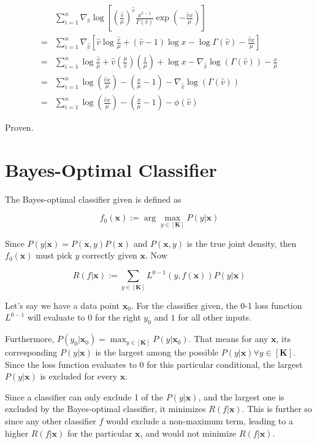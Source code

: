 \documentclass[11pt]{scrartcl}
\begin{document}
\begin{align*}
&\sum_{i=1}^n \nabla_{\hat{v}} \log{\left[ \left(\frac{{\hat{v}}}{\mu}\right)^{\hat{v}} \frac{x^{{\hat{v}}-1}}{\Gamma({\hat{v}})} \exp{\left(-\frac{{\hat{v}}x}{\mu}\right)} \right]} \\
= &\sum_{i=1}^n \nabla_{\hat{{\hat{v}}}} \left[ {\hat{v}} \log{\frac{{\hat{v}}}{\mu}} + ({\hat{v}}-1)\log{x} - \log{\Gamma({\hat{v}})} - \frac{{\hat{v}}x}{\mu} \right] \\
= &\sum_{i=1}^n \log{\frac{{\hat{v}}}{\mu}} + {\hat{v}}\left(\frac{\mu}{{\hat{v}}}\right)\left(\frac{1}{\mu}\right) + \log{x} - \nabla_{\hat{{\hat{v}}}} \log{(\Gamma({\hat{v}}))} - \frac{x}{\mu} \\
= &\sum_{i=1}^n \log{\left(\frac{{\hat{v}}x}{\mu}\right)} - \left(\frac{x}{\mu} - 1\right) - \nabla_{\hat{{\hat{v}}}}\log{(\Gamma({\hat{v}}))} \\
= &\sum_{i=1}^n \log{\left(\frac{{\hat{v}}x}{\mu}\right)} - \left(\frac{x}{\mu} - 1\right) - \phi(\hat{v})
\end{align*}

Proven.

\section{Bayes-Optimal Classifier}

The Bayes-optimal classifier given is defined as

\[f_0(\mathbf{x}) := \arg\max_{y \in [\mathbf{K}]} P(y | \mathbf{x})\]

Since $P(y|\mathbf{x}) = P(\mathbf{x}, y)P(\mathbf{x})$ and $P(\mathbf{x}, y)$ is the true joint density, then $f_0(\mathbf{x})$ must pick $y$ correctly given $\mathbf{x}$. Now

\[R(f|\mathbf{x}) := \sum_{y \in [\mathbf{K}]} L^{0-1}(y,f(\mathbf{x}))P(y|\mathbf{x})\]

Let's say we have a data point $\mathbf{x}_0$. For the classifier given, the 0-1 loss function $L^{0-1}$ will evaluate to 0 for the right $y_0$ and $1$ for all other inputs.

Furthermore, $P(y_0|\mathbf{x}_0) = \max_{y\in[\mathbf{K}]}P(y|\mathbf{x}_0)$. That means for any $\mathbf{x}$, its corresponding $P(y|\mathbf{x})$ is the largest among the possible $P(y|\mathbf{x}) \forall y \in [\mathbf{K}]$. Since the loss function evaluates to 0 for this particular conditional, the largest $P(y|\mathbf{x})$ is excluded for every $\mathbf{x}$.

Since a classifier can only exclude 1 of the $P(y|\mathbf{x})$, and the largest one is excluded by the Bayes-optimal classifier, it minimizes $R(f|\mathbf{x})$. This is further so since any other classifier $f$ would exclude a non-maximum term, leading to a higher $R(f|\mathbf{x})$ for the particular $\mathbf{x}$, and would not minimize $R(f|\mathbf{x})$.
\end{document}
